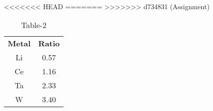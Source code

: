 \begin{table}[htbp]
  \centering
  \caption{Table-2}
<<<<<<< HEAD
  \label{tab:tables/table2.tex}
=======
  \label{table2}
>>>>>>> d734831 (Assignment)
  \begin{tabular}{cc}
\textbf{Metal} & \textbf{Ratio} \\
Li & 0.57 \\
Ce & 1.16 \\
Ta & 2.33 \\
W & 3.40 \\
  \end{tabular}
\end{table}